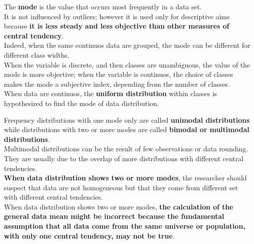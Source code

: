 \begin{frame}
  \begin{small}
    \vspace{.35cm}
    The \textbf{mode} is the value that occurs most frequently in a data set.\\
    \vspace{.35cm}
    It is not influenced by outliers; however it is used only for descriptive aims because \textbf{it is less steady and less objective than other measures of central tendency}.\\
    \vspace{.35cm}
    Indeed, when the same continuos data are grouped, the mode can be different for different class widths.\\
    \vspace{.35cm}
    When the variable is discrete, and then classes are unambiguous, the value of the mode is more objective; when the variable is continuos, the choice of classes makes the mode a subjective index, depending from the number of classes.\\
    \vspace{.35cm}
    When data are continuos, the \textbf{uniform distribution} within classes is hypothesized to find the mode of data distribution.
  \end{small}
\end{frame}

\begin{frame}
  \begin{small}
    \vspace{.3cm}
    Frequency distributions with one mode only are called \textbf{unimodal distributions} while distributions with two or more modes are called \textbf{bimodal or multimodal distributions}.\\
    \vspace{.3cm}
    Multimodal distributions can be the result of few observations or data rounding. They are usually due to the overlap of more distributions with different central tendencies.\\
    \vspace{.3cm}
    \textbf{When data distribution shows two or more modes}, the researcher should suspect that data are not homogeneous but that they come from different set with different central tendencies.\\
    \vspace{.3cm}
    When data distribution shows two or more modes, \textbf{the calculation of the general data mean might be incorrect because the fundamental assumption that all data come from the same universe or population, with only one central tendency, may not be true}.
  \end{small}
\end{frame}


